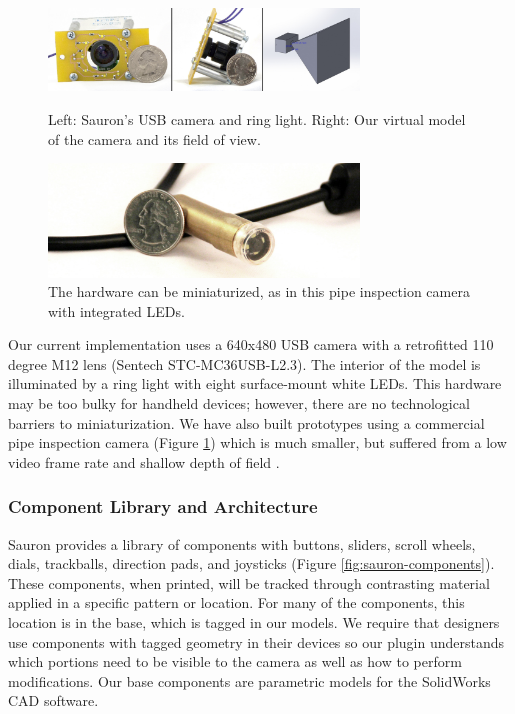 \begin{figure}
\centering
\includegraphics[width=3.25in]{figures/sauron/camera-front-and-side.jpg}
\caption{Left: Sauron's USB camera and ring light. Right: Our virtual model of the camera and its field of view.}
\label{fig:sauron-hardware}
\vspace{0.2in}
\includegraphics[width=3.25in]{figures/sauron/pipe-camera2.jpg}
\caption{The hardware can be miniaturized, as in this pipe inspection camera with integrated LEDs.}
\label{fig:sauron-inspectioncam}
\end{figure}

Our current implementation uses a 640x480 USB camera with a retrofitted 110 degree M12 lens (Sentech STC-MC36USB-L2.3). The interior of the model is illuminated by a ring light with eight surface-mount white LEDs. This hardware may be too bulky for handheld devices; however, there are no technological barriers to miniaturization. We have also built prototypes using a commercial pipe inspection camera (Figure \ref{fig:sauron-inspectioncam}) which is much smaller, but suffered from a low video frame rate and shallow depth of field .


\subsubsection{Component Library and Architecture }
Sauron provides a library of components with buttons, sliders, scroll wheels, dials, trackballs, direction pads, and joysticks (Figure \ref{fig:sauron-components}). These components, when printed, will be tracked through contrasting material applied in a specific pattern or location. For many of the components, this location is in the base, which is tagged in our models. We require that designers use components with tagged geometry in their devices so our plugin understands which portions need to be visible to the camera as well as how to perform modifications. Our base components are parametric models for the SolidWorks CAD software.

